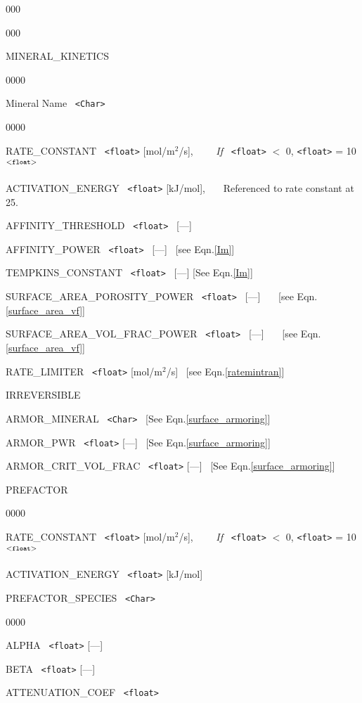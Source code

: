 \begin{deflist}{000}
\begin{deflist}{000}
\item[MINERAL\_KINETICS] ~
\begin{deflist}{0000}
\item [Mineral Name]  \ {\tt <Char>}
\begin{deflist}{0000}
\item [RATE\_CONSTANT] \ {\tt <float>} [mol/m$^2$/s], \ \ \ \ {\em If} \ {\tt <float>} $<$ 0, {\tt <float>} = 10$^{\tt <float>}$
\item [ACTIVATION\_ENERGY] \ {\tt <float>} [kJ/mol], \ \ \ Referenced to rate constant at 25\degc.
~\\
\item [AFFINITY\_THRESHOLD] \ {\tt <float>} \ [---]
\item [AFFINITY\_POWER] \ {\tt <float>} \ [---] \ [see Eqn.\eqref{Im}]
~\\
\item [TEMPKINS\_CONSTANT] \ {\tt <float>} \ [---] [See Eqn.\eqref{Im}]
~\\
\item [SURFACE\_AREA\_POROSITY\_POWER] \ {\tt <float>} \ [---] \ \ \ [see Eqn.\eqref{surface_area_vf}]
\item [SURFACE\_AREA\_VOL\_FRAC\_POWER] \ {\tt <float>} \ [---] \ \ \ [see Eqn.\eqref{surface_area_vf}]
~\\
\item [RATE\_LIMITER] \ {\tt <float>} [mol/m$^2$/s] \ [see Eqn.\eqref{ratemintran}]
~\\
\item [IRREVERSIBLE] \ 
~\\
\item[ARMOR\_MINERAL] \ {\tt <Char>} \ [See Eqn.\eqref{surface_armoring}]
\item[ARMOR\_PWR] \ {\tt <float>} [---] \ [See Eqn.\eqref{surface_armoring}]
\item[ARMOR\_CRIT\_VOL\_FRAC] \ {\tt <float>} [---] \ [See Eqn.\eqref{surface_armoring}]
~\\
\item [PREFACTOR] ~
\begin{deflist}{0000}
\item [RATE\_CONSTANT] \ {\tt <float>} [mol/m$^2$/s], \ \ \ \ {\em If} \ {\tt <float>} $<$ 0, {\tt <float>} = 10$^{\tt <float>}$
\item [ACTIVATION\_ENERGY] \ {\tt <float>} [kJ/mol] 
\item [PREFACTOR\_SPECIES] \ {\tt <Char>}
\begin{deflist}{0000}
\item [ALPHA] \ {\tt <float>} [---]
\item [BETA] \ {\tt <float>} [---]
\item [ATTENUATION\_COEF] \ {\tt <float>}
\end{deflist}
\item [\keyend]
\end{deflist}
\item [\keyend]
\end{deflist}


\end{deflist}
\end{deflist}
\end{deflist}
